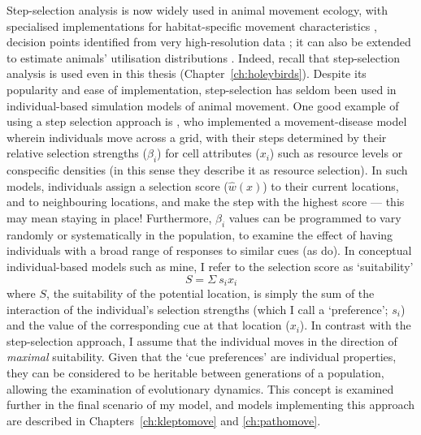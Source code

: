 \begin{tcolorbox}[width=\textwidth,
    boxsep=0pt,
    left=0pt,
    right=0pt,
    top=2pt,
    arc=0pt,
    boxrule=0.0pt,toprule=1pt,
    bottomrule=1pt,
    colback=white
    ]%
    \begin{description}[font=\scshape\bfseries]
        \item[Box B. Using Step-selection in Conceptual Models] Step-selection analysis is now widely used in animal movement ecology, with specialised implementations for habitat-specific movement characteristics \parencite{avgar2016}, decision points identified from very high-resolution data \parencite{munden2021}; it can also be extended to estimate animals' utilisation distributions \parencite{signer2017}.
        Indeed, recall that step-selection analysis is used even in this thesis (Chapter~\ref{ch:holeybirds}).
        Despite its popularity and ease of implementation, step-selection has seldom been used in individual-based simulation models of animal movement.
        One good example of using a step selection approach is \textcite{white2018}, who implemented a movement-disease model wherein individuals move across a grid, with their steps determined by their relative selection strengths ($\beta_i$) for cell attributes ($x_i$) such as resource levels or conspecific densities (in this sense they describe it as resource selection).
        In such models, individuals assign a selection score ($\hat{w}(x)$) to their current locations, and to neighbouring locations, and make the step with the highest score --- this may mean staying in place!
        Furthermore, $\beta_i$ values can be programmed to vary randomly or systematically in the population, to examine the effect of having individuals with a broad range of responses to similar cues (as \cite{white2018} do).
        In conceptual individual-based models such as mine, I refer to the selection score as `suitability'
        $$
            S = \Sigma~s_{i}x_{i}
        $$
        where $S$, the suitability of the potential location, is simply the sum of the interaction of the individual's selection strengths (which I call a `preference'; $s_i$) and the value of the corresponding cue at that location ($x_i$).
        In contrast with the step-selection approach, I assume that the individual moves in the direction of \emph{maximal} suitability. 
        Given that the `cue preferences' are individual properties, they can be considered to be heritable between generations of a population, allowing the examination of evolutionary dynamics.
        This concept is examined further in the final scenario of my model, and models implementing this approach are described in Chapters~\ref{ch:kleptomove} and \ref{ch:pathomove}.
    \end{description}
\end{tcolorbox}

